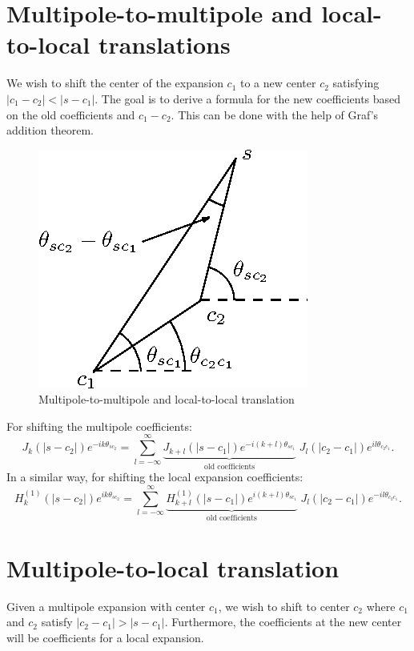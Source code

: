 \documentclass[10pt]{article}
\begin{document}
\section*{Multipole-to-multipole and local-to-local translations}

We wish to shift the center of the expansion $c_1$ to a new center $c_2$
satisfying $|c_1 - c_2| < |s - c_1|$. The goal is to derive a formula for the
new coefficients based on the old coefficients and $c_1 - c_2$. This can be done
with the help of Graf's addition theorem.

\begin{figure}[H]
\centering
\includegraphics{media/m2m-l2l-translation.eps}
\caption{Multipole-to-multipole and local-to-local translation}
\end{figure}
For shifting the multipole coefficients:
\[ J_k(|s - c_2|) e^{-i k \theta_{sc_2}} = \sum_{l = -\infty}^{\infty}
\underbrace{J_{k + l}(|s - c_1|) e^{-i (k + l) \theta_{sc_1}}}_{\textrm{old
    coefficients}} \; J_l(|c_2 - c_1|) e^{i l \theta_{c_2 c_1}}. \]
%
In a similar way, for shifting the local expansion coefficients:
%
\[ H_k^{(1)}(|s - c_2|)e^{ik\theta_{sc_2}} = \sum_{l = -\infty}^{\infty}
\underbrace{H_{k + l}^{(1)}(|s - c_1|) e^{i(k + l) \theta_{sc_1}} }_{\textrm{old
    coefficients}} \; J_l(|c_2 - c_1|) e^{-i l \theta_{c_2 c_1}}. \]


\section*{Multipole-to-local translation}

Given a multipole expansion with center $c_1$, we wish to shift to center $c_2$
where $c_1$ and $c_2$ satisfy $|c_2 - c_1| > |s - c_1|$. Furthermore, the
coefficients at the new center will be coefficients for a local expansion.
\end{document}
